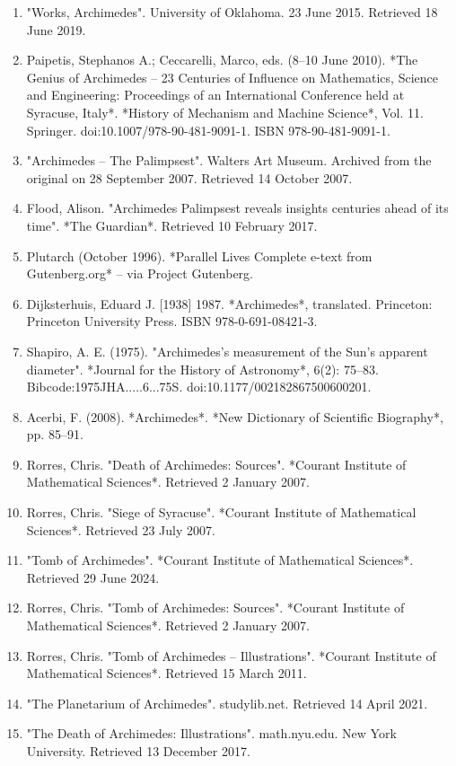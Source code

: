\begin{enumerate}
\item "Works, Archimedes". University of Oklahoma. 23 June 2015. Retrieved 18 June 2019.
\item Paipetis, Stephanos A.; Ceccarelli, Marco, eds. (8–10 June 2010). *The Genius of Archimedes – 23 Centuries of Influence on Mathematics, Science and Engineering: Proceedings of an International Conference held at Syracuse, Italy*. *History of Mechanism and Machine Science*, Vol. 11. Springer. doi:10.1007/978-90-481-9091-1. ISBN 978-90-481-9091-1.
\item "Archimedes – The Palimpsest". Walters Art Museum. Archived from the original on 28 September 2007. Retrieved 14 October 2007.
\item Flood, Alison. "Archimedes Palimpsest reveals insights centuries ahead of its time". *The Guardian*. Retrieved 10 February 2017.
\item Plutarch (October 1996). *Parallel Lives Complete e-text from Gutenberg.org* – via Project Gutenberg.
\item Dijksterhuis, Eduard J. [1938] 1987. *Archimedes*, translated. Princeton: Princeton University Press. ISBN 978-0-691-08421-3.
\item Shapiro, A. E. (1975). "Archimedes's measurement of the Sun's apparent diameter". *Journal for the History of Astronomy*, 6(2): 75–83. Bibcode:1975JHA.....6...75S. doi:10.1177/002182867500600201.
\item Acerbi, F. (2008). *Archimedes*. *New Dictionary of Scientific Biography*, pp. 85–91.
\item Rorres, Chris. "Death of Archimedes: Sources". *Courant Institute of Mathematical Sciences*. Retrieved 2 January 2007.
\item Rorres, Chris. "Siege of Syracuse". *Courant Institute of Mathematical Sciences*. Retrieved 23 July 2007.
\item "Tomb of Archimedes". *Courant Institute of Mathematical Sciences*. Retrieved 29 June 2024.
\item Rorres, Chris. "Tomb of Archimedes: Sources". *Courant Institute of Mathematical Sciences*. Retrieved 2 January 2007.
\item Rorres, Chris. "Tomb of Archimedes – Illustrations". *Courant Institute of Mathematical Sciences*. Retrieved 15 March 2011.
\item "The Planetarium of Archimedes". studylib.net. Retrieved 14 April 2021.
\item "The Death of Archimedes: Illustrations". math.nyu.edu. New York University. Retrieved 13 December 2017.

\end{enumerate}
